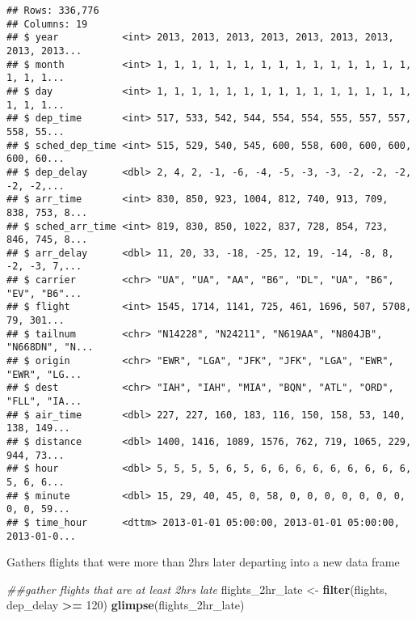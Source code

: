 \documentclass[
]{article}
\newenvironment{Shaded}{\begin{snugshade}}{\end{snugshade}}
\newcommand{\CommentTok}[1]{\textcolor[rgb]{0.56,0.35,0.01}{\textit{#1}}}
\newcommand{\DecValTok}[1]{\textcolor[rgb]{0.00,0.00,0.81}{#1}}
\newcommand{\KeywordTok}[1]{\textcolor[rgb]{0.13,0.29,0.53}{\textbf{#1}}}
\newcommand{\NormalTok}[1]{#1}
\newcommand{\OperatorTok}[1]{\textcolor[rgb]{0.81,0.36,0.00}{\textbf{#1}}}
\newcommand{\StringTok}[1]{\textcolor[rgb]{0.31,0.60,0.02}{#1}}
\begin{document}
\begin{verbatim}
## Rows: 336,776
## Columns: 19
## $ year           <int> 2013, 2013, 2013, 2013, 2013, 2013, 2013, 2013, 2013...
## $ month          <int> 1, 1, 1, 1, 1, 1, 1, 1, 1, 1, 1, 1, 1, 1, 1, 1, 1, 1...
## $ day            <int> 1, 1, 1, 1, 1, 1, 1, 1, 1, 1, 1, 1, 1, 1, 1, 1, 1, 1...
## $ dep_time       <int> 517, 533, 542, 544, 554, 554, 555, 557, 557, 558, 55...
## $ sched_dep_time <int> 515, 529, 540, 545, 600, 558, 600, 600, 600, 600, 60...
## $ dep_delay      <dbl> 2, 4, 2, -1, -6, -4, -5, -3, -3, -2, -2, -2, -2, -2,...
## $ arr_time       <int> 830, 850, 923, 1004, 812, 740, 913, 709, 838, 753, 8...
## $ sched_arr_time <int> 819, 830, 850, 1022, 837, 728, 854, 723, 846, 745, 8...
## $ arr_delay      <dbl> 11, 20, 33, -18, -25, 12, 19, -14, -8, 8, -2, -3, 7,...
## $ carrier        <chr> "UA", "UA", "AA", "B6", "DL", "UA", "B6", "EV", "B6"...
## $ flight         <int> 1545, 1714, 1141, 725, 461, 1696, 507, 5708, 79, 301...
## $ tailnum        <chr> "N14228", "N24211", "N619AA", "N804JB", "N668DN", "N...
## $ origin         <chr> "EWR", "LGA", "JFK", "JFK", "LGA", "EWR", "EWR", "LG...
## $ dest           <chr> "IAH", "IAH", "MIA", "BQN", "ATL", "ORD", "FLL", "IA...
## $ air_time       <dbl> 227, 227, 160, 183, 116, 150, 158, 53, 140, 138, 149...
## $ distance       <dbl> 1400, 1416, 1089, 1576, 762, 719, 1065, 229, 944, 73...
## $ hour           <dbl> 5, 5, 5, 5, 6, 5, 6, 6, 6, 6, 6, 6, 6, 6, 6, 5, 6, 6...
## $ minute         <dbl> 15, 29, 40, 45, 0, 58, 0, 0, 0, 0, 0, 0, 0, 0, 0, 59...
## $ time_hour      <dttm> 2013-01-01 05:00:00, 2013-01-01 05:00:00, 2013-01-0...
\end{verbatim}

Gathers flights that were more than 2hrs later departing into a new data
frame

\begin{Shaded}
\begin{Highlighting}[]
\CommentTok{##gather flights that are at least 2hrs late}
\NormalTok{flights_2hr_late <-}\StringTok{ }\KeywordTok{filter}\NormalTok{(flights, dep_delay }\OperatorTok{>=}\StringTok{ }\DecValTok{120}\NormalTok{)}
\KeywordTok{glimpse}\NormalTok{(flights_2hr_late)}
\end{Highlighting}
\end{Shaded}
\end{document}
